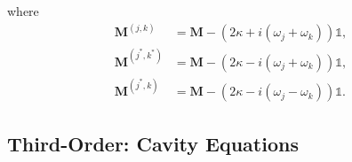 \documentclass{article}
\begin{document}
where
\begin{subequations}
	\begin{align}
		\bm{M}^{(j, k)} &= \bm{M} - \left( 2 \kappa + i \left( \omega_{j} + \omega_{k} \right) \right) \mathbb{1}, \\
		\bm{M}^{(j^{*}, k^{*})} &= \bm{M} - \left( 2 \kappa - i \left( \omega_{j} + \omega_{k} \right) \right) \mathbb{1}, \\
		\bm{M}^{(j^{*}, k)} &= \bm{M} - \left( 2 \kappa - i \left( \omega_{j}- \omega_{k} \right) \right) \mathbb{1}.
	\end{align}
\end{subequations}

\subsection{Third-Order: Cavity Equations}
\end{document}
